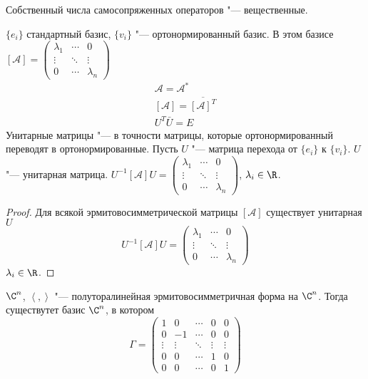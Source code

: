 \begin{conseq}
	Собственный числа самосопряженных операторов "--- вещественные.
\end{conseq}
$\{e_i\}$ стандартный базис, $\{v_i\}$ "--- ортонормированный базис.
В этом базисе
$
	[\mathscr A] = \begin{pmatrix}
		\lambda_1 & \cdots & 0 \\
		\vdots & \ddots & \vdots \\
		0 & \cdots & \lambda_n
	\end{pmatrix}
$
\begin{gather*}
	\mathscr A = \mathscr{A}^* \\
	[\mathscr A] = \overline{[\mathscr A]^T} \\
	U^T\bar U = E
\end{gather*}
Унитарные матрицы "--- в точности матрицы, которые ортонормированный переводят в ортонормированные.
Пусть $U$ "--- матрица перехода от $\{e_i\}$ к $\{v_i\}$.
$U$  "--- унитарная матрица.
$
	U^{-1} [\mathscr A] U = \begin{pmatrix}
		\lambda_1 & \cdots & 0 \\
		\vdots & \ddots & \vdots \\
		0 & \cdots & \lambda_n
	\end{pmatrix}
$, $\lambda_i \in \R$.

\begin{proof}
	Для всякой эрмитовосимметрической матрицы  $[\mathscr A]$ существует унитарная $U$
	\[
		U^{-1}[\mathscr A]U = \begin{pmatrix}
			\lambda_1 & \cdots & 0 \\
			\vdots & \ddots & \vdots \\
			0 & \cdots & \lambda_n
		\end{pmatrix}
	\]
	$\lambda_i \in \R$.
\end{proof}

\begin{theorem}
	$\C^n$, $\left<,\right>$ "--- полуторалинейная эрмитовосимметричная форма на $\C^n$.
	Тогда существутет базис $\C^n$, в котором
	\[
		\Gamma = \begin{pmatrix}
			1 & 0 &\cdots & 0 & 0 \\
			0 &-1 &\cdots & 0 & 0 \\
			\vdots&\vdots &\ddots&\vdots&\vdots\\
			0 & 0 &\cdots & 1 & 0 \\
			0 & 0 &\cdots & 0 & 1
		\end{pmatrix}
	\]
\end{theorem}

